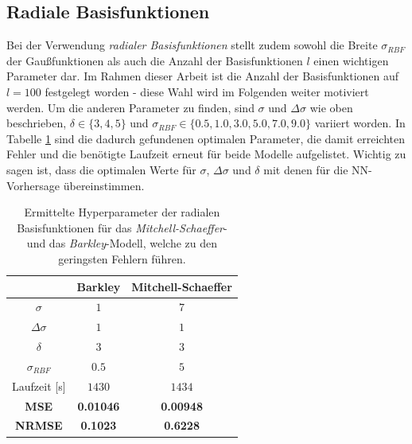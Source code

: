 \FloatBarrier
\subsection{Radiale Basisfunktionen}
Bei der Verwendung \textit{radialer Basisfunktionen} stellt zudem sowohl die Breite $\sigma_{RBF}$ der Gaußfunktionen als auch die Anzahl der Basisfunktionen $l$ einen wichtigen Parameter dar. Im Rahmen dieser Arbeit ist die Anzahl der Basisfunktionen auf $l=100$ festgelegt worden - diese Wahl wird im Folgenden weiter motiviert werden. Um die anderen Parameter zu finden, sind $\sigma$ und $\Delta \sigma$ wie oben beschrieben, $\delta \in \{3,4,5\}$ und $\sigma_{RBF} \in \{0.5, 1.0, 3.0, 5.0, 7.0, 9.0\}$ variiert worden. In Tabelle \ref{tab:exp_cross_rbf_results} sind die dadurch gefundenen optimalen Parameter, die damit erreichten Fehler und die benötigte Laufzeit erneut für beide Modelle aufgelistet. Wichtig zu sagen ist, dass die optimalen Werte für $\sigma$, $\Delta \sigma$ und $\delta$ mit denen für die NN-Vorhersage übereinstimmen. 

\begin{table}[h]
	\centering

	\begin{tabular}{ccc}
		\hline 			
		\multicolumn{1}{c}{} & Barkley & Mitchell-Schaeffer \\ 
		\hline 
		\rule[-1ex]{0pt}{2.5ex} $\sigma$ & $1$ & $7$ \\ 
		\rule[-1ex]{0pt}{2.5ex} $\Delta \sigma$ & $1$ & $1$ \\ 
		\rule[-1ex]{0pt}{2.5ex} $\delta$ & $3$ & $3$ \\ 
		\rule[-1ex]{0pt}{2.5ex} $\sigma_{RBF}$ & $0.5$ & $5$ \\ 
		\rule[-1ex]{0pt}{2.5ex} Laufzeit [s] & $1430$ & $1434$ \\ 
		\rule[-1ex]{0pt}{2.5ex} \textbf{MSE} & \textbf{0.01046} & \textbf{0.00948} \\ 
		\rule[-1ex]{0pt}{2.5ex} \textbf{NRMSE} & \textbf{0.1023} & \textbf{0.6228} \\ 
		\hline 
	\end{tabular} 
	\caption{Ermittelte Hyperparameter der radialen Basisfunktionen für das \textit{Mitchell-Schaeffer}- und das \textit{Barkley}-Modell, welche zu den geringsten Fehlern führen.}
	\label{tab:exp_cross_rbf_results}
\end{table} 

